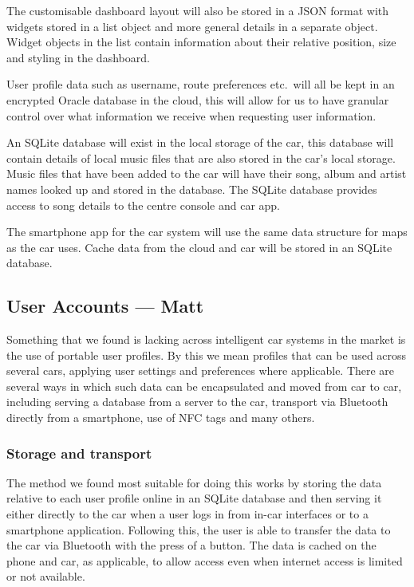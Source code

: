 \documentclass{article}
\begin{document}
The customisable dashboard layout will also be stored in a JSON format with widgets stored in a list object and more general details in a separate object. Widget objects in the list contain information about their relative position, size and styling in the dashboard.

User profile data such as username, route preferences etc.\ will all be kept in an encrypted Oracle database in the cloud, this will allow for us to have granular control over what information we receive when requesting user information.

An SQLite database will exist in the local storage of the car, this database will contain details of local music files that are also stored in the car's local storage. Music files that have been added to the car will have their song, album and artist names looked up and stored in the database. The SQLite database provides access to song details to the centre console and car app.

The smartphone app for the car system will use the same data structure for maps as the car uses. Cache data from the cloud and car will be stored in an SQLite database.

\subsection{User Accounts --- Matt}\label{ssec:user-accounts}
Something that we found is lacking across intelligent car systems in the market is the use of portable user profiles. By this we mean profiles that can be used across several cars, applying user settings and preferences where applicable.
There are several ways in which such data can be encapsulated and moved from car to car, including serving a database from a server to the car, transport via Bluetooth directly from a smartphone, use of NFC tags and many others.
\subsubsection{Storage and transport}
The method we found most suitable for doing this works by storing the data relative to each user profile online in an SQLite database and then serving it either directly to the car when a user logs in from in-car interfaces or to a smartphone application. Following this, the user is able to transfer the data to the car via Bluetooth with the press of a button. The data is cached on the phone and car, as applicable, to allow access even when internet access is limited or not available.
\end{document}
